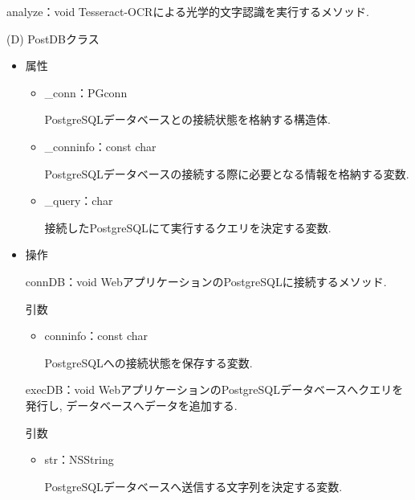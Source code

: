 \begin{description}
\begin{itemize}
\begin{itembox}[l]{analyze：void}
Tesseract-OCRによる光学的文字認識を実行するメソッド.
\end{itembox}
\end{itemize}

\item (D) PostDBクラス
\begin{itemize}
\item 属性

\begin{breakbox}
\begin{itemize}
\item \_conn：PGconn

PostgreSQLデータベースとの接続状態を格納する構造体.

\item \_conninfo：const char

PostgreSQLデータベースの接続する際に必要となる情報を格納する変数.

\item \_query：char

接続したPostgreSQLにて実行するクエリを決定する変数.
\end{itemize}
\end{breakbox}

\item 操作

\begin{itembox}[l]{connDB：void}
WebアプリケーションのPostgreSQLに接続するメソッド.

\begin{itembox}[l]{引数}
\begin{itemize}
\item conninfo：const char

PostgreSQLへの接続状態を保存する変数.
\end{itemize}
\end{itembox}
\end{itembox}

\begin{itembox}[l]{execDB：void}
WebアプリケーションのPostgreSQLデータベースへクエリを発行し, データベースへデータを追加する.

\begin{itembox}[l]{引数}
\begin{itemize}
\item str：NSString

PostgreSQLデータベースへ送信する文字列を決定する変数.
\end{itemize}
\end{itembox}
\end{itembox}


\end{itemize}
\end{description}
